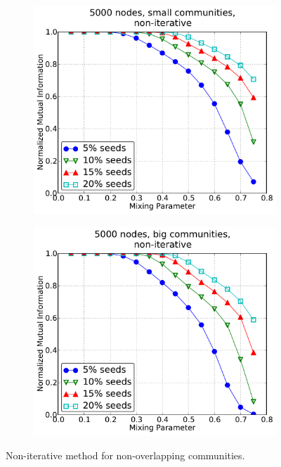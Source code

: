 \begin{figure}[h!]
    \begin{subfigure}{0.5\textwidth}
    \centering
    \includegraphics[width=\appplotwidth]{plots/nonoverlap_noniter_c.pdf}
    \end{subfigure}%
    \begin{subfigure}{0.5\textwidth}
    \centering
    \includegraphics[width=\appplotwidth]{plots/nonoverlap_noniter_d.pdf}
    \end{subfigure}
    \caption{Non-iterative method for non-overlapping communities.}\label{fig:no_iter_no_overlap}
\end{figure}
